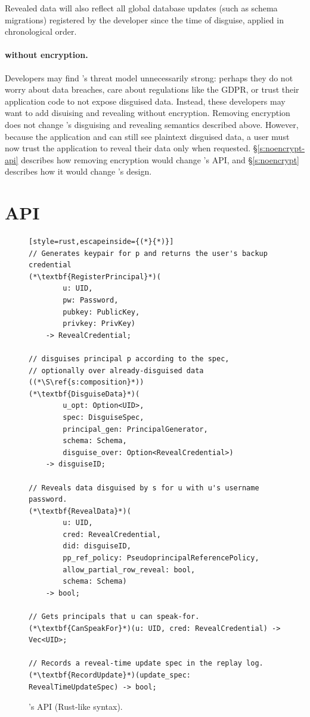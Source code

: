 Revealed data will also reflect all global database updates (such as schema
migrations) registered by the developer since the time of disguise, applied in
chronological order.


\paragraph{\sys without encryption.}
\label{s:semantics:noencrypt}

Developers may find \sys's threat model unnecessarily strong: perhaps they do
not worry about data breaches, care about regulations like the GDPR, or trust
their application code to not expose disguised data. Instead, these developers
may want to add disuising and revealing without encryption.
%
Removing encryption does not change \sys's disguising and revealing semantics
described above.
However, because the application and \sys can still see plaintext disguised
data, a user must now trust the application to reveal their data only when 
requested. 
%
\S\ref{s:noencrypt-api} describes how removing encryption would change \sys's
API, and \S\ref{s:noencrypt} describes how it would change
\sys's design.


\section{API}
\label{s:api}

\begin{figure}[t]
\begin{lstlisting}[style=rust,escapeinside={(*}{*)}]
// Generates keypair for p and returns the user's backup credential
(*\textbf{RegisterPrincipal}*)(
        u: UID, 
        pw: Password,
        pubkey: PublicKey, 
        privkey: PrivKey)
    -> RevealCredential;

// disguises principal p according to the spec, 
// optionally over already-disguised data ((*\S\ref{s:composition}*))
(*\textbf{DisguiseData}*)(
        u_opt: Option<UID>, 
        spec: DisguiseSpec,
        principal_gen: PrincipalGenerator,
        schema: Schema,
        disguise_over: Option<RevealCredential>) 
    -> disguiseID;

// Reveals data disguised by s for u with u's username password. 
(*\textbf{RevealData}*)(
        u: UID, 
        cred: RevealCredential,
        did: disguiseID, 
        pp_ref_policy: PseudoprincipalReferencePolicy,
        allow_partial_row_reveal: bool,
        schema: Schema)
    -> bool;

// Gets principals that u can speak-for.
(*\textbf{CanSpeakFor}*)(u: UID, cred: RevealCredential) -> Vec<UID>;

// Records a reveal-time update spec in the replay log.
(*\textbf{RecordUpdate}*)(update_spec: RevealTimeUpdateSpec) -> bool;
\end{lstlisting}
\caption{\sys's API (Rust-like syntax).}
\label{f:api-high}
\end{figure}
%

